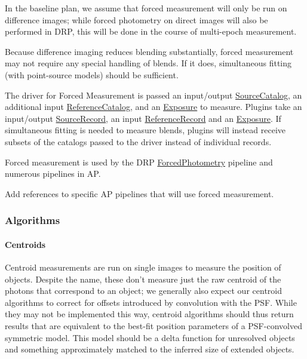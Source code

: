 In the baseline plan, we assume that forced measurement will only be run on difference images; while forced photometry on direct images will also be performed in DRP, this will be done in the course of multi-epoch measurement.

Because difference imaging reduces blending substantially, forced measurement may not require any special handling of blends.  If it does, simultaneous fitting (with point-source models) should be sufficient.

The driver for Forced Measurement is passed an input/output \hyperref[sec:spTablesSource]{SourceCatalog}, an additional input \hyperref[sec:spTablesReference]{ReferenceCatalog}, and an \hyperref[sec:spImagesExposure]{Exposure} to measure.  Plugins take an input/output \hyperref[sec:spTablesSource]{SourceRecord}, an input \hyperref[sec:spTablesReference]{ReferenceRecord} and an \hyperref[sec:spImagesExposure]{Exposure}.  If simultaneous fitting is needed to measure blends, plugins will instead receive subsets of the catalogs passed to the driver instead of individual records.

Forced measurement is used by the DRP \hyperref[sec:drpForcedPhotometry]{ForcedPhotometry} pipeline and numerous pipelines in AP.

\begin{note}[TODO]
Add references to specific AP pipelines that will use forced measurement.
\end{note}

\subsubsection{Algorithms}
\label{sec:acMeasurementAlgorithms}
\paragraph{Centroids}
\label{sec:acCentroidAlgorithms}

Centroid measurements are run on single images to measure the position of objects.  Despite the name, these don't measure just the raw centroid of the photons that correspond to an object; we generally also expect our centroid algorithms to correct for offsets introduced by convolution with the PSF.
While they may not be implemented this way, centroid algorithms should thus return results that are equivalent to the best-fit position parameters of a PSF-convolved symmetric model.  This model should be a delta function for unresolved objects and something approximately matched to the inferred size of extended objects.

